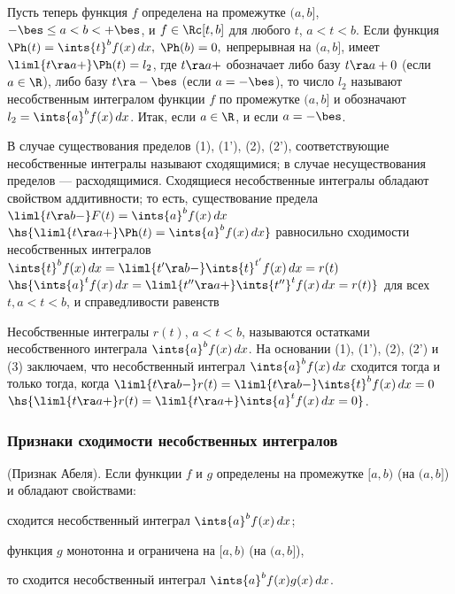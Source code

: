 \documentclass[a4paper]{article}
\begin{document}
Пусть теперь функция $f$ определена на промежутке $(a,b]$, $-\bes
\le a < b < +\bes$, и $f\in\Rc[t,b]$ для любого $t$, $a<t<b$. Если
функция $\Ph(t) = \ints{t}^b f(x)\,dx, \; \Ph(b)=0,$ непрерывная на
$(a,b]$, имеет $\liml{t\ra a+} \Ph(t) = l_2$, где $t\ra a+$
обозначает либо базу $t\ra a+0$ (если $a\in\R$), либо базу $t\ra
-\bes$ (если $a = -\bes$), то число $l_2$ называют несобственным
интегралом функции $f$ по промежутке $(a,b]$ и обозначают $l_2 =
\ints{a}^b f(x)\,dx$. Итак,  если $a\in\R$, и
 если $a=-\bes$.

В случае существования пределов (1), (1'), (2), (2'),
соответствующие несобственные интегралы называют сходящимися; в
случае несуществования пределов --- расходящимися. Сходящиеся
несобственные интегралы обладают свойством аддитивности; то есть,
существование предела $\liml{t\ra b-} F(t) = \ints{a}^b f(x)\,dx$
$\hs{\liml{t\ra a+} \Ph(t) = \ints{a}^b f(x)\,dx}$ равносильно
сходимости несобственных интегралов $\ints{t}^b f(x)\,dx =
\liml{t'\ra b-} \ints{t}^{t'} f(x)\,dx = r(t)$ $\hs{\ints{a}^t
f(x)\,dx = \liml{t''\ra a+} \ints{t''}^t f(x)\,dx = r(t)}$ для всех
$t, a<t<b$, и справедливости равенств 

Несобственные интегралы $r(t)$, $a<t<b$, называются остатками
несобственного интеграла $\ints{a}^b f(x)\,dx$. На основании (1),
(1'), (2), (2') и (3) заключаем, что несобственный интеграл
$\ints{a}^b f(x)\,dx$ сходится тогда и только тогда, когда
$\liml{t\ra b-} r(t) = \liml{t\ra b-} \ints{t}^b f(x)\,dx =0$
$\hs{\liml{t\ra a+} r(t) = \liml{t\ra a+} \ints{a}^t f(x)\,dx=0}$.

\subsubsection{Признаки сходимости несобственных интегралов}

\begin{theorem}
(Признак Абеля). Если функции $f$ и $g$ определены на промежутке
$[a,b)$ (на $(a,b]$) и обладают свойствами: \begin{nums}{-2} \item
сходится несобственный интеграл $\ints{a}^b f(x)\,dx$; \item функция
$g$ монотонна и ограничена на $[a,b)$ (на $(a,b]$),\end{nums} то
сходится несобственный интеграл $\ints{a}^b f(x)g(x)\,dx$.
\end{theorem}
\end{document}
